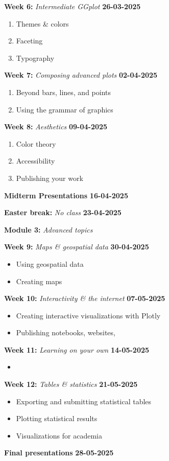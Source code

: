 \documentclass{article}
\newcommand{\week}[3]{
    \begin{center}
        \textbf{#1:} \textit{#2} \dotfill \textbf{#3}
    \end{center}
}
\newcommand{\specialweek}[2]{
    \begin{center}
        \textbf{#1} \dotfill \textbf{#2}
    \end{center}
}
\newcommand{\module}[2]{
    \vspace{2em}
    \large
    \textbf{#1:} \textit{#2}
    \normalsize
}
\begin{document}
\week{Week 6}{Intermediate GGplot}{26-03-2025}
\begin{enumerate}
    \item Themes \& colors
    \item Faceting
    \item Typography
\end{enumerate}

\week{Week 7}{Composing advanced plots}{02-04-2025}
\begin{enumerate}
    \item Beyond bars, lines, and points
    \item Using the grammar of graphics
\end{enumerate}

\week{Week 8}{Aesthetics}{09-04-2025}
\begin{enumerate}
    \item Color theory
    \item Accessibility
    \item Publishing your work
\end{enumerate}

\specialweek{Midterm Presentations}{16-04-2025}
\week{Easter break}{No class}{23-04-2025}

\module{Module 3}{Advanced topics}

\week{Week 9}{Maps \& geospatial data}{30-04-2025}
\begin{itemize}
    \item Using geospatial data
    \item Creating maps
\end{itemize}

\week{Week 10}{Interactivity \& the internet}{07-05-2025}
\begin{itemize}
    \item Creating interactive visualizations with Plotly
    \item Publishing notebooks, websites, 
\end{itemize}

\week{Week 11}{Learning on your own}{14-05-2025}
\begin{itemize}
    \item 
\end{itemize}

\week{Week 12}{Tables \& statistics}{21-05-2025}
\begin{itemize}
    \item Exporting and submitting statistical tables
    \item Plotting statistical results
    \item Visualizations for academia
\end{itemize}

\specialweek{Final presentations}{28-05-2025}
\end{document}
